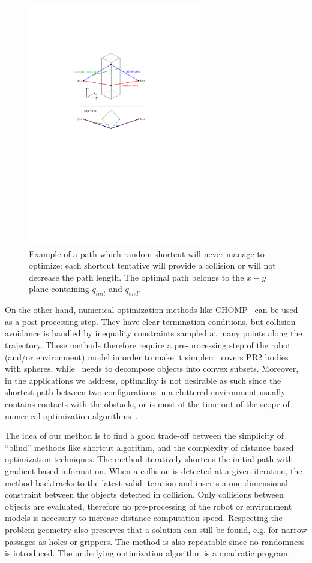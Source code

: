 \documentclass{tADR2e}
\begin{document}
\begin{figure}[H]
	\centering
	\includegraphics[width=7.5cm]{decoupled_DOF_optimization.pdf}
	\caption{Example of a path which random shortcut will never manage to 
	optimize: each shortcut tentative will provide a collision or will not 
	decrease the path length. The optimal path belongs to the $x-y$ plane 
	containing $q_{init}$ and $q_{end}$.}
	\label{decoupled_DOF_optimization}
\end{figure}


On the other hand, numerical
optimization methods like CHOMP~\cite{RatliffChomp} can be used as a
post-processing step. They have clear termination conditions, but collision
avoidance is handled by inequality constraints sampled at many points along
the trajectory. These methods therefore require a pre-processing step of the
robot (and/or environment) model in order to make 
it simpler:~\cite{RatliffChomp} covers PR2 bodies with spheres, 
while~\cite{convexOptimMotplan} needs to decompose objects into convex subsets.
Moreover, in the applications we address, optimality is not desirable as
such since the shortest path between two configurations in a cluttered
environment usually contains contacts with the obstacle,
or is most of the time
out of the scope of numerical optimization algorithms~\cite{LaumondOptim}.

The idea of our method is to find a good trade-off between
the simplicity of “blind” methods like shortcut algorithm,
and the complexity of distance based optimization techniques.
The method iteratively shortens the initial path with gradient-based information.
When a collision is detected at a given iteration, the method backtracks to the
latest valid iteration and inserts a one-dimensional constraint
between the objects detected in collision. Only collisions between objects are 
evaluated, therefore no pre-processing of the
robot or environment models is necessary to increase distance computation speed. 
Respecting the problem geometry also 
preserves that a solution can still be found, e.g. for narrow passages as holes or 
grippers. The method is also repeatable since no randomness is introduced. The underlying optimization algorithm is a quadratic program.
\end{document}
